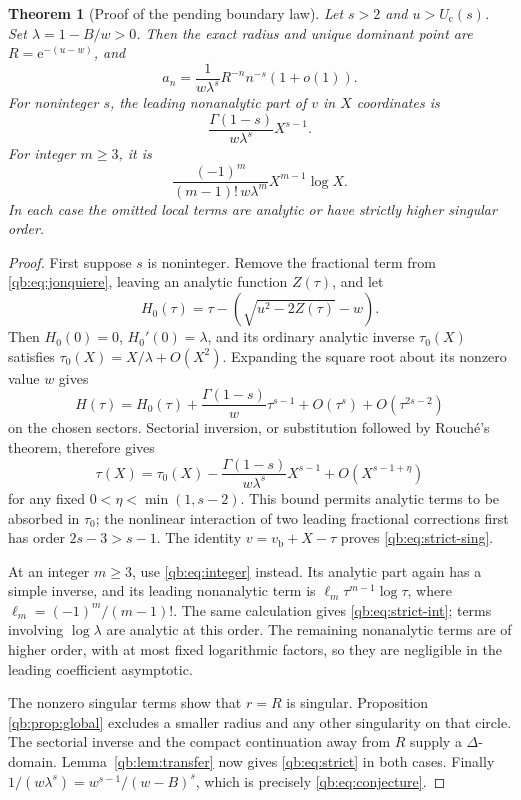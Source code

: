 \documentclass[11pt,a4paper]{article}
\newtheorem{theorem}{Theorem}[section]
\theoremstyle{definition}\newtheorem{definition}[theorem]{Definition}
\theoremstyle{remark}\newtheorem{remark}[theorem]{Remark}
\newcommand{\ee}{\mathrm e}
\newcommand{\Uc}{U_{\mathrm c}}
\newcommand{\vb}{v_{\mathrm b}}
\numberwithin{equation}{section}
\begin{document}
\begin{theorem}[Proof of the pending boundary law]\label{qb:thm:strict}
Let $s>2$ and $u>\Uc(s)$. Set
\(\lambda=1-B/w>0\). Then the exact radius and unique dominant point are
$R=\ee^{-(u-w)}$, and
\begin{equation}\label{qb:eq:strict}
 a_n=\frac1{w\lambda^s}R^{-n}n^{-s}(1+o(1)).
\end{equation}
For noninteger $s$, the leading nonanalytic part of $v$ in $X$ coordinates is
\begin{equation}\label{qb:eq:strict-sing}
 \frac{\Gamma(1-s)}{w\lambda^s}X^{s-1}.
\end{equation}
For integer $m\ge3$, it is
\begin{equation}\label{qb:eq:strict-int}
 \frac{(-1)^m}{(m-1)!\,w\lambda^m}X^{m-1}\log X.
\end{equation}
In each case the omitted local terms are analytic or have strictly higher
singular order.
\end{theorem}
\begin{proof}
First suppose $s$ is noninteger. Remove the fractional term from
\eqref{qb:eq:jonquiere}, leaving an analytic function $Z(\tau)$, and let
\[
 H_0(\tau)=\tau-
 \left(\sqrt{u^2-2Z(\tau)}-w\right).
\]
Then $H_0(0)=0$, $H_0'(0)=\lambda$, and its ordinary analytic inverse
$\tau_0(X)$ satisfies $\tau_0(X)=X/\lambda+O(X^2)$.
Expanding the square root about its nonzero value $w$ gives
\[
 H(\tau)=H_0(\tau)+\frac{\Gamma(1-s)}w\tau^{s-1}
 +O(\tau^s)+O(\tau^{2s-2})
\]
on the chosen sectors. Sectorial inversion, or substitution followed by
Rouch\'e's theorem, therefore gives
\[
 \tau(X)=\tau_0(X)-
 \frac{\Gamma(1-s)}{w\lambda^s}X^{s-1}
 +O(X^{s-1+\eta})
\]
for any fixed $0<\eta<\min(1,s-2)$. This bound permits analytic terms to
be absorbed in $\tau_0$; the nonlinear interaction of two leading
fractional corrections first has order $2s-3>s-1$.
The identity $v=\vb+X-\tau$ proves \eqref{qb:eq:strict-sing}.

At an integer $m\ge3$, use \eqref{qb:eq:integer} instead. Its analytic
part again has a simple inverse, and its leading nonanalytic term is
$\ell_m\tau^{m-1}\log\tau$, where
$\ell_m=(-1)^m/(m-1)!$. The same calculation gives
\eqref{qb:eq:strict-int}; terms involving $\log\lambda$ are analytic at
this order. The remaining nonanalytic terms are of higher order, with at
most fixed logarithmic factors, so they are negligible in the leading
coefficient asymptotic.

The nonzero singular terms show that $r=R$ is singular. Proposition
\ref{qb:prop:global} excludes a smaller radius and any other singularity
on that circle. The sectorial inverse and the compact continuation away
from $R$ supply a $\Delta$-domain. Lemma~\ref{qb:lem:transfer} now gives
\eqref{qb:eq:strict} in both cases. Finally
$1/(w\lambda^s)=w^{s-1}/(w-B)^s$, which is precisely
\eqref{qb:eq:conjecture}.
\end{proof}
\end{document}
